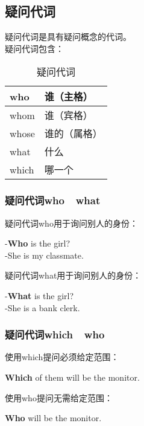 \documentclass[UTF8]{ctexart}
\newcommand{\littf}[1]{{\hspace{3pt}\ttfamily #1}}
\begin{document}
\subsection{疑问代词}
    疑问代词是具有疑问概念的代词。\\[3mm]
    疑问代词包含：
    \begin{table}[h]
        \begin{center}
            \ttfamily
            \begin{tabular}{p{70pt}|p{70pt}}
                \hline
                who&谁（主格）\\ \hline
                whom&谁（宾格）\\ \hline
                whose&谁的（属格）\\ \hline
                what&什么\\ \hline
                which&哪一个\\ \hline
            \end{tabular}
            \rmfamily
            \caption{疑问代词}
        \end{center}
    \end{table}\vspace{-25pt}

\subsubsection{疑问代词\littf{who}~~\littf{what}}
    疑问代词\littf{who\hphantom{t}}用于询问别人的身份：
    \begin{center}
        \large\ttfamily
        -\textbf{Who} is the girl?\hphantom{xxxx}\\[2mm]
        -She is my classmate.\\[4mm]
    \end{center}
    疑问代词\littf{what}用于询问别人的身份：
    \begin{center}
        \large\ttfamily
        -\textbf{What} is the girl?\hphantom{xxx}\\[2mm]
        -She is a bank clerk.\\[4mm]
    \end{center}

\subsubsection{疑问代词\littf{which}~~\littf{who}}
    使用\littf{which}提问必须给定范围：
    \begin{center}
        \large\ttfamily
        \textbf{Which} of them will be the monitor.\\[4mm]
    \end{center}
    使用\littf{\hphantom{x}who\hphantom{x}}提问无需给定范围：
    \begin{center}
        \large\ttfamily
        \textbf{Who} will be the monitor.
    \end{center}
\end{document}
